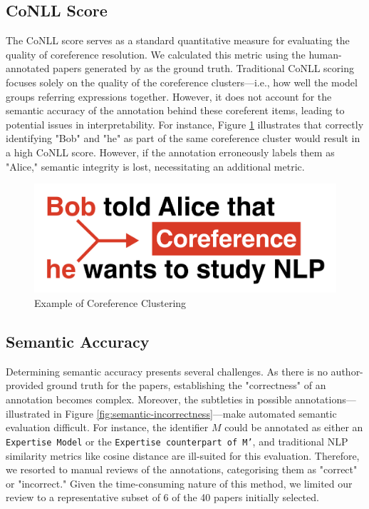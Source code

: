 \subsection{CoNLL Score}
The CoNLL score serves as a standard quantitative measure for evaluating the quality of coreference resolution. We calculated this metric using the human-annotated papers generated by \citet{asakura2022building} as the ground truth. Traditional CoNLL scoring focuses solely on the quality of the coreference clusters—i.e., how well the model groups referring expressions together. However, it does not account for the semantic accuracy of the annotation behind these coreferent items, leading to potential issues in interpretability. For instance, Figure \ref{fig:coreference} illustrates that correctly identifying "Bob" and "he" as part of the same coreference cluster would result in a high CoNLL score. However, if the annotation erroneously labels them as "Alice," semantic integrity is lost, necessitating an additional metric.

\begin{figure}[htpb]
  \centering
  \begin{minipage}{\textwidth}
    \centering
    \includegraphics[width=14cm]{images/coreference.png}
    \caption[Example for coreference]{Example of Coreference Clustering \citep{asakura2022building}\footnotemark}
    \label{fig:coreference}
  \end{minipage}
\end{figure}

\subsection{Semantic Accuracy}

Determining semantic accuracy presents several challenges. As there is no author-provided ground truth for the papers, establishing the "correctness" of an annotation becomes complex. Moreover, the subtleties in possible annotations—illustrated in Figure \ref{fig:semantic-incorrectness}—make automated semantic evaluation difficult. For instance, the identifier $\mathbf{}{M}$ could be annotated as either an \texttt{Expertise Model} or the \texttt{Expertise counterpart of M'}, and traditional NLP similarity metrics like cosine distance are ill-suited for this evaluation. Therefore, we resorted to manual reviews of the annotations, categorising them as "correct" or "incorrect." Given the time-consuming nature of this method, we limited our review to a representative subset of 6 of the 40 papers initially selected.

